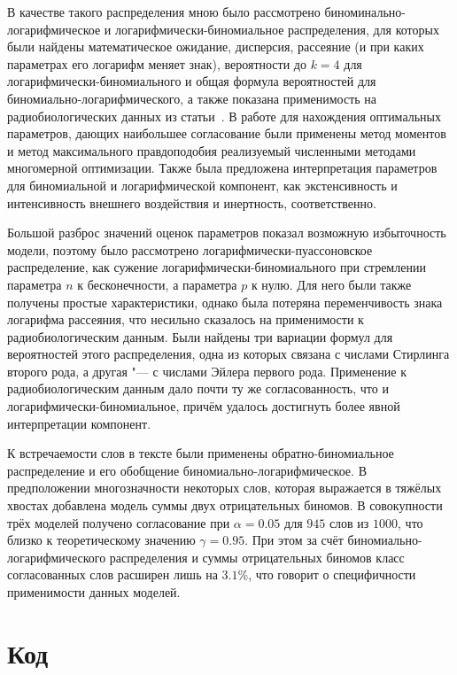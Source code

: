 \documentclass[12pt, specialist, subf, substylefile = spbu_report.rtx]{disser}
\begin{document}
	В качестве такого распределения мною было рассмотрено биноминально-логарифмическое и логарифмически-биномиальное распределения, для которых были найдены математическое ожидание, дисперсия, рассеяние (и при каких параметрах его логарифм меняет знак), вероятности до $ k = 4 $ для логарифмически-биномиального и общая формула вероятностей для биномиально-логарифмического, а также показана применимость на радиобиологических данных из статьи~\cite{bib:alexeeva2008}. В работе для нахождения оптимальных параметров, дающих наибольшее согласование были применены метод моментов и метод максимального правдоподобия реализуемый численными методами многомерной оптимизации. Также была предложена интерпретация параметров для биномиальной и логарифмической компонент, как экстенсивность и интенсивность внешнего воздействия и инертность, соответственно.
	
	Большой разброс значений оценок параметров показал возможную избыточность модели, поэтому было рассмотрено логарифмически-пуассоновское распределение, как сужение логарифмически-биномиального при стремлении параметра $n$ к бесконечности, а параметра $p$ к нулю. Для него были также получены простые характеристики, однако была потеряна переменчивость знака логарифма рассеяния, что несильно сказалось на применимости к радиобиологическим данным. Были найдены три вариации формул для вероятностей этого распределения, одна из которых связана с числами Стирлинга второго рода, а другая "--- с числами Эйлера первого рода. Применение к радиобиологическим данным дало почти ту же согласованность, что и логарифмически-биномиальное, причём удалось достигнуть более явной интерпретации компонент.
	
	К встречаемости слов в тексте были применены обратно-биномиальное распределение и его обобщение биномиально-логарифмическое. В предположении многозначности некоторых слов, которая выражается в \glqq тяжёлых\grqq~ хвостах добавлена модель суммы двух отрицательных биномов. В совокупности трёх моделей получено согласование при $\alpha = 0.05$ для $945$ слов из $1000$, что близко к теоретическому значению $\gamma = 0.95$. При этом за счёт биномиально-логарифмического распределения и суммы отрицательных биномов класс согласованных слов расширен лишь на $3.1 \%$, что говорит о специфичности применимости данных моделей.
	
	
	
	
	\appendix
	
	\chapter{Код}
	
\end{document}
